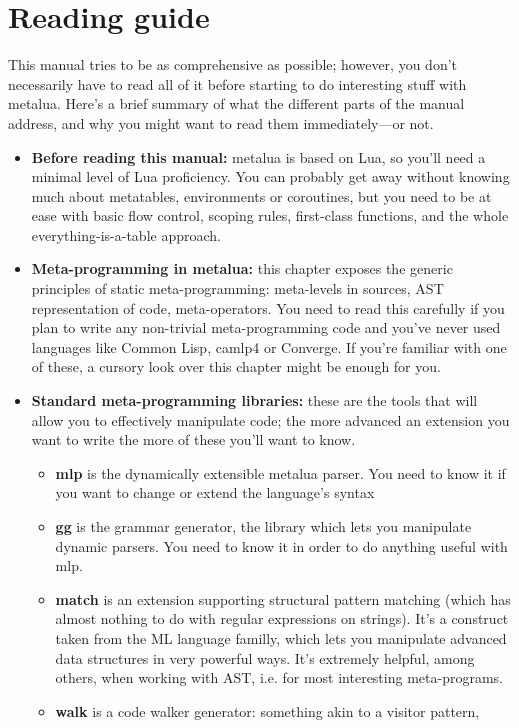 \section*{Reading guide}
This manual tries to be as comprehensive as possible; however, you don't
necessarily have to read all of it before starting to do interesting stuff with
metalua. Here's a brief summary of what the different parts of the manual
address, and why you might want to read them immediately---or not.

\begin{itemize}
\item{\bf Before reading this manual:} metalua is based on Lua, so
  you'll need a minimal level of Lua proficiency. You can probably get
  away without knowing much about metatables, environments or
  coroutines, but you need to be at ease with basic flow control,
  scoping rules, first-class functions, and the whole
  everything-is-a-table approach.
\item{\bf Meta-programming in metalua:} this chapter exposes the generic principles
  of static meta-programming: meta-levels in sources, AST representation of
  code, meta-operators. You need to read this carefully if you plan to write any
  non-trivial meta-programming code and you've never used languages like Common
  Lisp, camlp4 or Converge. If you're familiar with one of these, a cursory look
  over this chapter might be enough for you.
\item{\bf Standard meta-programming libraries:} these are the tools that will allow
  you to effectively manipulate code; the more advanced an extension you want to
  write the more of these you'll want to know.
  \begin{itemize}
  \item{\bf mlp} is the dynamically extensible metalua parser. You need to know it
    if you want to change or extend the language's syntax
  \item{\bf gg} is the grammar generator, the library which lets you manipulate
    dynamic parsers. You need to know it in order to do anything useful with
    mlp.
  \item{\bf match} is an extension supporting structural pattern matching (which has
    almost nothing to do with regular expressions on strings). It's a construct
    taken from the ML language familly, which lets you manipulate advanced data
    structures in very powerful ways. It's extremely helpful, among others, when
    working with AST, i.e. for most interesting meta-programs.
  \item{\bf walk} is a code walker generator: something akin to a visitor pattern,

\end{itemize}
\end{itemize}
